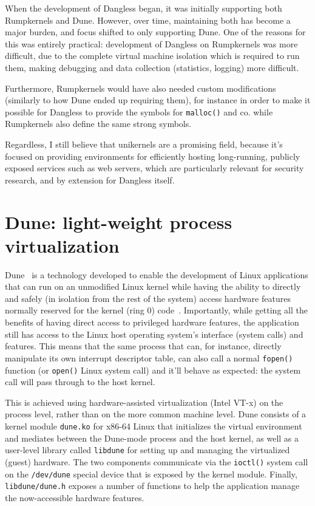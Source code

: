 When the development of Dangless began, it was initially supporting both Rumpkernels and Dune. However, over time, maintaining both has become a major burden, and focus shifted to only supporting Dune. One of the reasons for this was entirely practical: development of Dangless on Rumpkernels was more difficult, due to the complete virtual machine isolation which is required to run them, making debugging and data collection (statistics, logging) more difficult.

Furthermore, Rumpkernels would have also needed custom modifications (similarly to how Dune ended up requiring them), for instance in order to make it possible for Dangless to provide the symbols for \lstinline!malloc()! and co. while Rumpkernels also define the same strong symbols.

Regardless, I still believe that unikernels are a promising field, because it's focused on providing environments for efficiently hosting long-running, publicly exposed services such as web servers, which are particularly relevant for security research, and by extension for Dangless itself.

\section{Dune: light-weight process virtualization}
\label{sec:bg-dune}

Dune~\cite{dune-website} is a technology developed to enable the development of Linux applications that can run on an unmodified Linux kernel while having the ability to directly and safely (in isolation from the rest of the system) access hardware features normally reserved for the kernel (ring 0) code~\cite{dune-paper}. Importantly, while getting all the benefits of having direct access to privileged hardware features, the application still has access to the Linux host operating system's interface (system calls) and features. This means that the same process that can, for instance, directly manipulate its own interrupt descriptor table, can also call a normal \lstinline!fopen()! function (or \lstinline!open()! Linux system call) and it'll behave as expected: the system call will pass through to the host kernel.

This is achieved using hardware-assisted virtualization (Intel VT-x) on the process level, rather than on the more common machine level. Dune consists of a kernel module \texttt{dune.ko} for x86-64 Linux that initializes the virtual environment and mediates between the Dune-mode process and the host kernel, as well as a user-level library called \texttt{libdune} for setting up and managing the virtualized (guest) hardware. The two components communicate via the \lstinline!ioctl()! system call on the \texttt{/dev/dune} special device that is exposed by the kernel module. Finally, \texttt{libdune/dune.h} exposes a number of functions to help the application manage the now-accessible hardware features.

